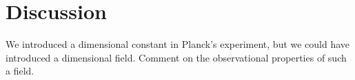 \documentclass{article}
\begin{document}
\section{Discussion}
We introduced a dimensional constant in Planck's experiment, but we could have introduced a dimensional field. Comment on the observational properties of such a field.





\end{document}
